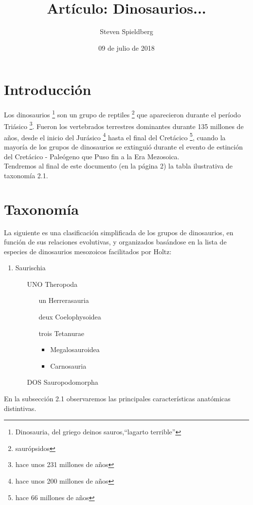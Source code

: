 \documentclass{article}
\title{Art\'iculo: Dinosaurios...}
\author{Steven  Spieldberg}
\date{09 de julio de 2018}
\begin{document}
  
\maketitle 
\section{Introducci\'on}
Los dinosaurios \footnote{Dinosauria, del griego deinos sauros,``lagarto terrible''} son un grupo de reptiles \footnote{saur\'opsidos} que aparecieron durante el per\'iodo Tri\'asico \footnote{hace unos 231 millones de a\~nos}. Fueron los vertebrados terrestres dominantes durante 135 millones de a\~nos, desde el inicio del Jur\'asico \footnote{hace unos 200 millones de a\~nos} hasta el final del Cret\'acico \footnote{hace 66 millones de a\~nos}, cuando la mayor\'ia de los grupos de dinosaurios se extingui\'o durante el evento de estinci\'on del Cret\'acico - Pale\'ogeno que Puso fin a la Era Mezosoica.\\
\indent
Tendremos al final de este documento (en la p\'agina 2) la tabla ilustrativa de taxonom\'ia 2.1.

\section{Taxonom\'ia}
La siguiente es una clasificaci\'on simplificada de los grupos de dinosaurios, en funci\'on de sus relaciones evolutivas, y organizados bas\'andose en la lista de especies de dinosaurios mesozoicos facilitados por Holtz:\\

\begin{enumerate}
\item Saurischia
	\begin{itemize}	
	\item[UNO]Theropoda
		\begin{itemize}
		\item[un]Herrerasauria
		\item[deux]Coelophysoidea
		\item[trois]Tetanurae
			\begin{itemize}
			\item Megalosauroidea
			\item Carnosauria
			\end{itemize}
		\end{itemize}
	\item[DOS]Sauropodomorpha
	\end{itemize}
\end{enumerate}
En la subsecci\'on 2.1 observaremos las principales caracter\'isticas anat\'omicas distintivas.
\end{document}
